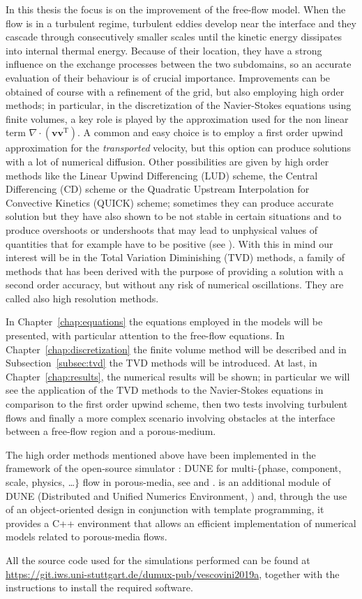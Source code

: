 In this thesis the focus is on the improvement of the free-flow model. When the 
flow is in a turbulent regime, turbulent eddies develop near the interface and 
they cascade through consecutively smaller scales until the kinetic energy 
dissipates into internal thermal energy. Because of their location, they have 
a strong influence on the exchange processes between the two subdomains, so an 
accurate evaluation of their behaviour is of crucial importance. Improvements 
can be obtained of course with a refinement of the grid, but also employing 
high order methods; in 
particular, in the discretization of the Navier-Stokes equations using finite 
volumes, a key role is played by the approximation used for the non linear term 
$\nabla \cdot (\mathbf{v} \mathbf{v}^\mathrm{T})$. A common and easy 
choice is to employ a first order upwind approximation for the 
\emph{transported} velocity, but this option can produce solutions with a lot 
of numerical diffusion. Other possibilities are given by high order methods 
like the Linear Upwind Differencing (LUD) scheme, the Central Differencing (CD) 
scheme or the Quadratic Upstream Interpolation for Convective Kinetics (QUICK) 
scheme; sometimes they can produce 
accurate solution but they have also shown to be not stable in certain 
situations and to produce overshoots or undershoots that 
may lead to unphysical values of quantities that for example have to be 
positive (see \cite{main:vermal}). With this in mind our interest will be in 
the Total Variation Diminishing (TVD) methods, a family of methods that has 
been derived with the purpose of providing a solution with a second order 
accuracy, but without any risk of numerical oscillations. They are called also 
high resolution methods.

In Chapter~\ref{chap:equations} the equations employed in the models will be 
presented, with particular attention to the free-flow equations. In 
Chapter~\ref{chap:discretization} the finite volume method will be described 
and in Subsection~\ref{subsec:tvd} the TVD methods will be introduced. At last, 
in Chapter~\ref{chap:results}, the numerical results will be shown; in 
particular we will see the application of the TVD methods to the Navier-Stokes 
equations in comparison to the first order upwind scheme, then two tests 
involving turbulent flows and finally a more complex scenario involving 
obstacles at the interface between a free-flow region and a porous-medium.

The high order methods mentioned above have been implemented in the framework 
of the open-source simulator \DUMUX: DUNE for multi-$\{$phase, component, 
scale, physics, \dots$\}$ flow in porous-media, see \cite{dumux:tutti} and 
\cite{dumux:flemisch}. \DUMUX is an 
additional module of DUNE (Distributed and Unified Numerics Environment, 
\cite{web:dune}) and, through the use of an object-oriented design in 
conjunction with template programming, it provides a C++ environment that 
allows an efficient implementation of numerical models related to porous-media 
flows.

All the source code used for the simulations performed can be 
found at \url{https://git.iws.uni-stuttgart.de/dumux-pub/vescovini2019a}, 
together with the instructions to install the required software.